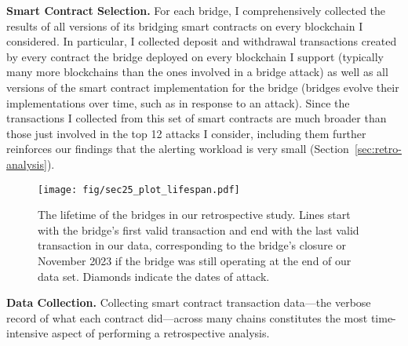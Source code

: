 \textbf{Smart Contract Selection.}
%
For each bridge, I comprehensively collected the results of all
versions of its bridging smart contracts on every blockchain I
considered.  In particular, I collected deposit and withdrawal
transactions created by every contract the bridge deployed on
every blockchain I support (typically many more blockchains than the
ones involved in a bridge attack) as well as all versions of the smart
contract implementation for the bridge (bridges evolve their
implementations over time, such as in response to an attack).
%
Since the transactions I collected from this set of smart contracts
are much broader than those just involved in the top 12 attacks I
consider, including them further reinforces our findings that the
alerting workload is very small (Section~\ref{sec:retro-analysis}).




\begin{figure}[t]
  \centering
  \texttt{[image: fig/sec25\_plot\_lifespan.pdf]}
  \caption[The Lifetime of Bridges in Our Study]{The lifetime of the bridges in our retrospective study.
    Lines start with the bridge's first valid transaction and end with the
    last valid transaction in our data, corresponding to the bridge's
    closure or November 2023 if the bridge was still operating at the
    end of our data set.  Diamonds indicate the dates of attack.}
  \label{fig:bridge-timeline}
\end{figure}


\textbf{Data Collection.}
Collecting smart contract transaction data---the verbose record of
what each contract did---across many chains constitutes the most
time-intensive aspect of performing a retrospective analysis.

